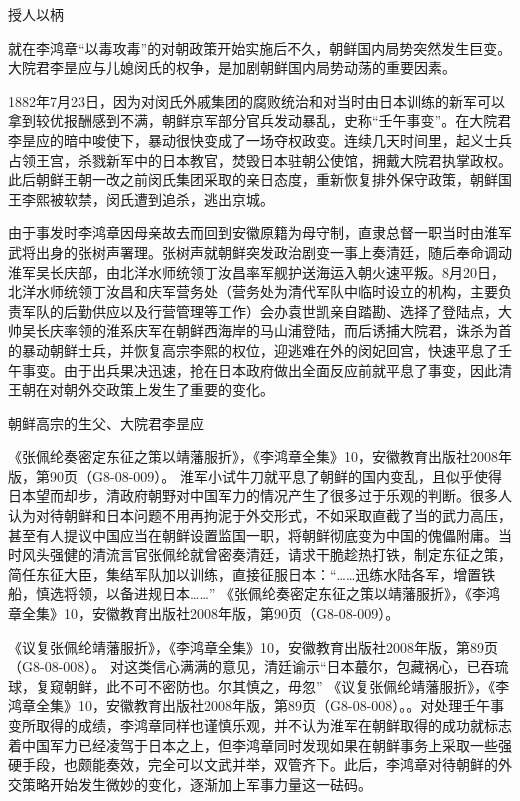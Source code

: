 \documentclass[12pt,UTF8]{ctexbook}
\begin{document}
授人以柄

就在李鸿章“以毒攻毒”的对朝政策开始实施后不久，朝鲜国内局势突然发生巨变。大院君李昰应与儿媳闵氏的权争，是加剧朝鲜国内局势动荡的重要因素。

1882年7月23日，因为对闵氏外戚集团的腐败统治和对当时由日本训练的新军可以拿到较优报酬感到不满，朝鲜京军部分官兵发动暴乱，史称“壬午事变”。在大院君李昰应的暗中唆使下，暴动很快变成了一场夺权政变。连续几天时间里，起义士兵占领王宫，杀戮新军中的日本教官，焚毁日本驻朝公使馆，拥戴大院君执掌政权。此后朝鲜王朝一改之前闵氏集团采取的亲日态度，重新恢复排外保守政策，朝鲜国王李熙被软禁，闵氏遭到追杀，逃出京城。

由于事发时李鸿章因母亲故去而回到安徽原籍为母守制，直隶总督一职当时由淮军武将出身的张树声署理。张树声就朝鲜突发政治剧变一事上奏清廷，随后奉命调动淮军吴长庆部，由北洋水师统领丁汝昌率军舰护送海运入朝火速平叛。8月20日，北洋水师统领丁汝昌和庆军营务处（营务处为清代军队中临时设立的机构，主要负责军队的后勤供应以及行营管理等工作）会办袁世凯亲自踏勘、选择了登陆点，大帅吴长庆率领的淮系庆军在朝鲜西海岸的马山浦登陆，而后诱捕大院君，诛杀为首的暴动朝鲜士兵，并恢复高宗李熙的权位，迎逃难在外的闵妃回宫，快速平息了壬午事变。由于出兵果决迅速，抢在日本政府做出全面反应前就平息了事变，因此清王朝在对朝外交政策上发生了重要的变化。


朝鲜高宗的生父、大院君李昰应

《张佩纶奏密定东征之策以靖藩服折》，《李鸿章全集》10，安徽教育出版社2008年版，第90页（G8-08-009）。
淮军小试牛刀就平息了朝鲜的国内变乱，且似乎使得日本望而却步，清政府朝野对中国军力的情况产生了很多过于乐观的判断。很多人认为对待朝鲜和日本问题不用再拘泥于外交形式，不如采取直截了当的武力高压，甚至有人提议中国应当在朝鲜设置监国一职，将朝鲜彻底变为中国的傀儡附庸。当时风头强健的清流言官张佩纶就曾密奏清廷，请求干脆趁热打铁，制定东征之策，简任东征大臣，集结军队加以训练，直接征服日本：“……迅练水陆各军，增置铁船，慎选将领，以备进规日本……” 《张佩纶奏密定东征之策以靖藩服折》，《李鸿章全集》10，安徽教育出版社2008年版，第90页（G8-08-009）。

《议复张佩纶靖藩服折》，《李鸿章全集》10，安徽教育出版社2008年版，第89页（G8-08-008）。
对这类信心满满的意见，清廷谕示“日本蕞尔，包藏祸心，已吞琉球，复窥朝鲜，此不可不密防也。尔其慎之，毋忽” 《议复张佩纶靖藩服折》，《李鸿章全集》10，安徽教育出版社2008年版，第89页（G8-08-008）。。对处理壬午事变所取得的成绩，李鸿章同样也谨慎乐观，并不认为淮军在朝鲜取得的成功就标志着中国军力已经凌驾于日本之上，但李鸿章同时发现如果在朝鲜事务上采取一些强硬手段，也颇能奏效，完全可以文武并举，双管齐下。此后，李鸿章对待朝鲜的外交策略开始发生微妙的变化，逐渐加上军事力量这一砝码。
\end{document}
